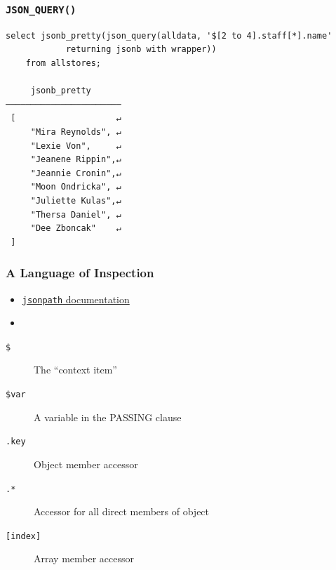 \begin{frame}[fragile]
  \frametitle{\texttt{JSON\_QUERY()}}
    \begin{lstlisting}
select jsonb_pretty(json_query(alldata, '$[2 to 4].staff[*].name'
            returning jsonb with wrapper))
    from allstores;

     jsonb_pretty      
───────────────────────
 [                    ↵
     "Mira Reynolds", ↵
     "Lexie Von",     ↵
     "Jeanene Rippin",↵
     "Jeannie Cronin",↵
     "Moon Ondricka", ↵
     "Juliette Kulas",↵
     "Thersa Daniel", ↵
     "Dee Zboncak"    ↵
 ]
    \end{lstlisting}
\end{frame}

\begin{frame}
  \frametitle{A Language of Inspection}

\begin{itemize}
  \item \href{https://www.postgresql.org/docs/17/functions-json.html\#FUNCTIONS-SQLJSON-PATH}{\texttt{jsonpath} documentation \faExternalLink}
    \item[]
\end{itemize}

  \begin{description}
    \item[\texttt{\$}] The ``context item''
    \item[\texttt{\$var}] A variable in the PASSING clause
    \item[\texttt{.key}] Object member accessor
    \item[\texttt{.*}] Accessor for all direct members of object
    \item[\texttt{[index]}] Array member accessor
  \end{description}
\end{frame}

